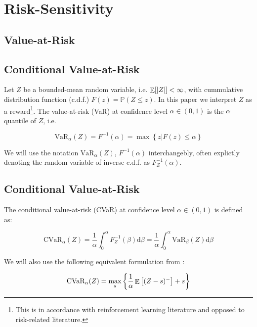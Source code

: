 

\section{Risk-Sensitivity}\label{sec:prelim:risk}


\subsection{Value-at-Risk}

\subsection{Conditional Value-at-Risk}

Let $Z$ be a bounded-mean random variable, i.e. $\mathop{\mathbb{E}}[|Z|] < \infty$, with cummulative distribution function (c.d.f.) $F(z) = \mathbb{P}(Z \le z)$.
In this paper we interpret $Z$ as a reward\footnote{This is in accordance with reinforcement learning literature and opposed to risk-related literature.}. The value-at-risk (VaR) at confidence level $\alpha \in (0,1)$ is the $\alpha$ quantile of $Z$, i.e. 

\begin{equation}
\text{VaR}_\alpha(Z)=F^{-1}(\alpha)=\max\left\lbrace z | F(z) \le \alpha \right\rbrace
\end{equation}

We will use the notation $\text{VaR}_\alpha(Z)$, $F^{-1}(\alpha)$ interchangebly, often explictly denoting the random variable of inverse c.d.f. as $F^{-1}_Z(\alpha)$.

\subsection{Conditional Value-at-Risk}
The conditional value-at-risk (CVaR) at confidence level $\alpha \in (0,1)$ is defined as:

\begin{equation}
\text{CVaR}_\alpha(Z) = \dfrac{1}{\alpha}\int_0^\alpha F^{-1}_Z(\beta) \text{d}\beta = \dfrac{1}{\alpha}\int_0^\alpha \text{VaR}_\beta(Z) \text{d}\beta
\end{equation}

We will also use the following equivalent formulation from \cite{rockafellar2000optimization}:

\begin{equation}\label{eq:cvardef}
\text{CVaR}_\alpha(Z)=
\max_s\left\lbrace \dfrac{1}{\alpha}\mathop{\mathbb{E}}
\left[ (Z-s)^-\right] + s  \right\rbrace 
\end{equation}

